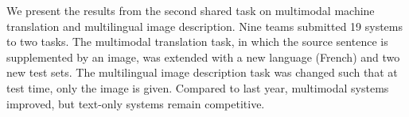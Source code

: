We present the results from the second shared task on multimodal machine translation and multilingual image description. Nine teams submitted 19 systems to two tasks. The multimodal translation task, in which the source sentence is supplemented by an image, was extended with a new language (French) and two new test sets. The multilingual image description task was changed such that at test time, only the image is given. Compared to last year, multimodal systems improved, but text-only systems remain competitive.
